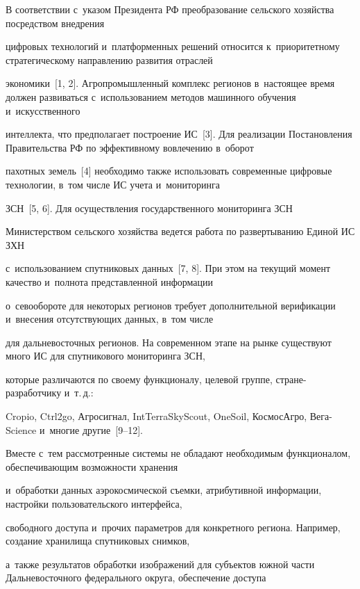 \vspace*{-4pt}



  В соответствии с~указом Президента РФ преобразование сельского хозяйства посредством внедрения 

  цифровых технологий и~платформенных решений относится к~приоритетному стратегическому на\-прав\-ле\-нию развития отраслей 

  экономики~[1, 2]. Агропромышленный комплекс регионов в~настоящее время должен развиваться с~использованием методов машинного обучения и~искусственного 

  интеллекта, что предполагает построение ИС~[3]. Для реализации По\-ста\-нов\-ле\-ния Правительства РФ по эффективному вовлечению в~оборот 

  пахотных земель~[4] необходимо также использовать современные циф\-ро\-вые технологии, в~том числе ИС учета и~мониторинга 

ЗСН~[5, 6]. Для осуществления государственного мониторинга ЗСН 

  Министерством сельского хозяйства ведется работа по развертыванию Единой ИС ЗХН

с~использованием спутниковых данных~[7, 8]. При этом на текущий момент качество и~полнота представленной информации 

  о~севообороте для некоторых регионов требует дополнительной верификации и~внесения отсутствующих данных, в~том чис\-ле 

  для дальневосточных регионов. На современном этапе на рынке существуют много ИС для спутникового мониторинга ЗСН, 

  которые различаются по своему функционалу, целевой группе, стра\-не-раз\-ра\-бот\-чи\-ку и~т.\,д.: 

  Cropio, Ctrl2go, Агросигнал, IntTerraSkyScout, OneSoil, КосмосАгро, Вега-Science и~многие другие~[9--12]. 

  Вместе с~тем рассмотренные сис\-те\-мы не обладают необходимым функционалом, обес\-пе\-чи\-ва\-ющим возможности хранения 

  и~обработки данных аэрокосмической съемки, атрибутивной информации, настройки пользовательского интерфейса, 

  свободного доступа и~прочих па\-ра\-мет\-ров для конкретного региона. Например, создание хранилища спутниковых снимков, 

  а~также результатов обработки изоб\-ра\-же\-ний для субъектов южной части Дальневосточного федерального округа, обеспечение доступа 

